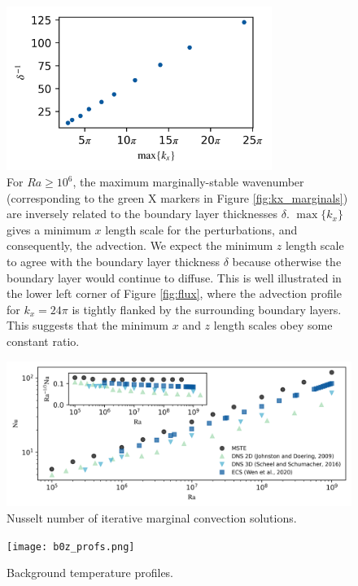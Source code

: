 \documentclass[reprint,amsmath,amssymb,aps]{revtex4-1}
\begin{document}
\begin{figure}[h]
    \centering
    \includegraphics[width=3.4in]{del_kx_inv.png}
    \caption{For $Ra \geq 10^6$, the maximum marginally-stable wavenumber (corresponding to the green X markers in Figure \ref{fig:kx_marginals}) are inversely related to the boundary layer thicknesses $\delta$. $\max \{ k_x \}$ gives a minimum $x$ length scale for the perturbations, and consequently, the advection. We expect the minimum $z$ length scale to agree with the boundary layer thickness $\delta$ because otherwise the boundary layer would continue to diffuse. This is well illustrated in the lower left corner of Figure \ref{fig:flux}, where the advection profile for $k_x = 24\pi$ is tightly flanked by the surrounding boundary layers. This suggests that the minimum $x$ and $z$ length scales obey some constant ratio.}
    \label{fig:my_label}
\end{figure}

\begin{figure}[h]
    \centering
    \includegraphics[width=7.1in]{nu_ra.PNG}
    \caption{Nusselt number of iterative marginal convection solutions.}
    \label{fig:nu_vs_ra}
\end{figure}
\begin{figure}[h]
    \centering
    \texttt{[image: b0z\_profs.png]}
    \caption{Background temperature profiles.}
    \label{fig:my_label}
\end{figure}
\end{document}
